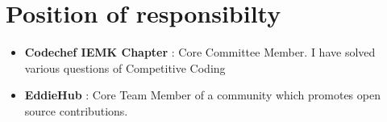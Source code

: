 \documentclass[letterpaper,11pt]{article}
\newcommand{\resumeItem}[1]{
  \item\small{
	{#1 \vspace{-2pt}}
  }
}
\newcommand{\resumeItemListStart}{\begin{itemize}}
\newcommand{\resumeItemListEnd}{\end{itemize}\vspace{-5pt}}
\begin{document}
  \section{Position of responsibilty}
 \begin{itemize}[leftmargin=0.15in, label={}]
        	\resumeItemListStart
        	\resumeItem{ \textbf{Codechef IEMK Chapter} : Core Committee Member. I have solved various questions of Competitive Coding}
        		\resumeItem{ \textbf{EddieHub} : Core Team  Member of a community which promotes open source contributions.}
        
      	\resumeItemListEnd
 \end{itemize}
\end{document}
